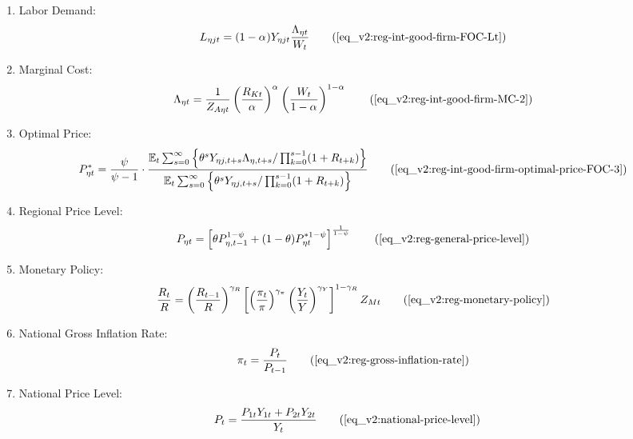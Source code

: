 \documentclass[../thesis.tex]{subfiles}
\begin{document}
{\begin{itemize}
\begin{enumerate}
		\item Labor Demand:
		\begin{align}
			L_{\eta jt} = (1-{\alpha_{}}) Y_{\eta jt} \frac{\Lambda_{\eta t}}{W_t} \tag{\ref{eq_v2:reg-int-good-firm-FOC-Lt}}
		\end{align}
		
		\item Marginal Cost:
		\begin{align}
			\Lambda_{\eta t} = \frac{1}{Z_{A\eta t}} \left( \frac{R_{Kt}}{{\alpha_{}}} \right)^{{\alpha_{}}} \left( \frac{W_t}{1-{\alpha_{}}} \right)^{1-{\alpha_{}}} \tag{\ref{eq_v2:reg-int-good-firm-MC-2}}
		\end{align}
		
		\item Optimal Price:
		\begin{align}
			P_{\eta t}^{\ast} = \frac{\psi}{\psi-1} \cdot \frac{ \E \sum_{s=0}^{\infty} \left\{ \theta^s Y_{\eta j,t+s} \Lambda_{\eta, t+s} / \prod_{k=0}^{s-1}(1+R_{t+k}) \right\}} {\E \sum_{s=0}^{\infty} \left\{ \theta^s Y_{\eta j,t+s} / \prod_{k=0}^{s-1}(1 + R_{t+k}) \right\}} \tag{\ref{eq_v2:reg-int-good-firm-optimal-price-FOC-3}}
		\end{align}
		
		\item Regional Price Level:
		\begin{align}
			P_{\eta t} = \left[ \theta P_{\eta,t-1}^{1-\psi} + (1-\theta) P_{\eta t}^{\ast 1-\psi} \right]^\frac{1}{1-\psi} \tag{\ref{eq_v2:reg-general-price-level}}
		\end{align}
		
		\item Monetary Policy:
		\begin{align}
			\frac{R_{t}}{R} = \left( \frac{R_{t-1}}{R} \right)^{\gamma_R} \left[ \left( \frac{\pi_t}{\pi} \right)^{\gamma_\pi} \left( \frac{Y_{t}}{Y} \right)^{\gamma_Y} \right]^{1-\gamma_R} Z_{Mt} \tag{\ref{eq_v2:reg-monetary-policy}}
		\end{align}
		
		\item National Gross Inflation Rate:
		\begin{align}
			\pi_t = \frac{P_t}{P_{t-1}} \tag{\ref{eq_v2:reg-gross-inflation-rate}}
		\end{align}
		
		\item National Price Level:
		\begin{align}
			P_{t} &= \frac{P_{1t} Y_{1t} + P_{2t} Y_{2t}}{Y_{t}} \tag{\ref{eq_v2:national-price-level}} %
		\end{align}
		

\end{enumerate}
\end{itemize}}
\end{document}
